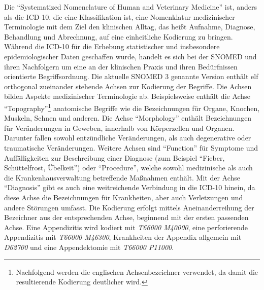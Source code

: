 \documentclass[pagesize,DIV=calc,12pt,final]{scrreprt}
\begin{document}
Die \enquote{Systematized Nomenclature of Human and Veterinary Medicine} ist, anders als die ICD-10, die eine Klassifikation ist, eine Nomenklatur medizinischer Terminologie mit dem Ziel den klinischen Alltag, das heißt Aufnahme, Diagnose, Behandlung und Abrechnung, auf eine einheitliche Kodierung zu bringen.
Während die ICD-10 für die Erhebung statistischer und insbesondere epidemiologischer Daten geschaffen wurde, handelt es sich bei der SNOMED und ihren Nachfolgern um eine an der klinischen Praxis und ihren Bedürfnissen orientierte Begriffsordnung.
Die aktuelle SNOMED 3 genannte Version enthält elf orthogonal zueinander stehende Achsen zur Kodierung der Begriffe. 
Die Achsen bilden Aspekte medizinischer Terminologie ab.
Beispielsweise enthält die Achse \enquote{Topography}\footnote{Nachfolgend werden die englischen Achsenbezeichner verwendet, da damit die resultierende Kodierung deutlicher wird.} anatomische Begriffe wie die Bezeichnungen für Organe, Knochen, Muskeln, Sehnen und anderen.
Die Achse \enquote{Morphology} enthält Bezeichnungen für Veränderungen in Geweben, innerhalb von Körperzellen und Organen. 
Darunter fallen sowohl entzündliche Veränderungen, als auch degenerative oder traumatische Veränderungen. 
Weitere Achsen sind \enquote{Function} für Symptome und Auffälligkeiten zur Beschreibung einer Diagnose (zum Beispiel \enquote{Fieber, Schüttelfrost, Übelkeit}) oder \enquote{Procedure}, welche sowohl medizinische als auch die Krankenhausverwaltung betreffende Maßnahmen enthält.
Mit der Achse \enquote{Diagnosis} gibt es auch eine weitreichende Verbindung in die ICD-10 hinein, da diese Achse die Bezeichnungen für Krankheiten, aber auch Verletzungen und andere Störungen umfasst.
Die Kodierung erfolgt mittels Aneinanderreihung der Bezeichner aus der entsprechenden Achse, beginnend mit der ersten passenden Achse. 
Eine Appendizitis wird kodiert mit \emph{T66000 M40000}, eine perforierende Appendizitis mit \emph{T66000 M46300}, Krankheiten der Appendix allgemein mit \emph{D62700} und eine Appendektomie mit \emph{T66000 P11000}.
\end{document}
